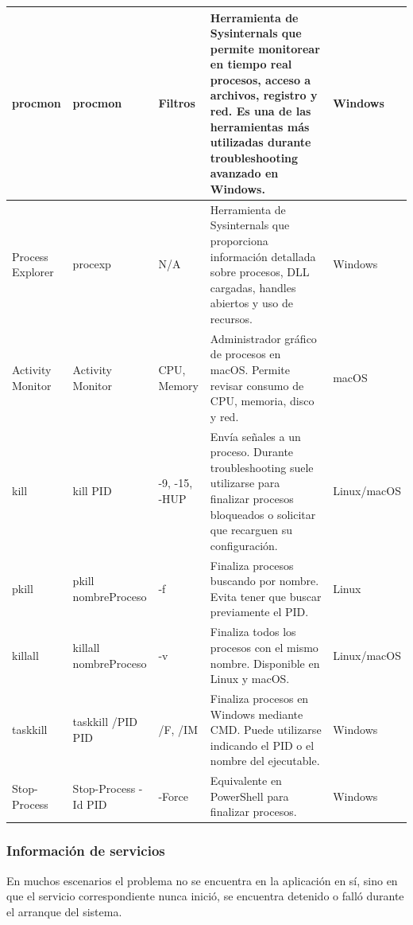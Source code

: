 \documentclass[a4paper,10pt]{article}
\begin{document}
\begin{longtable}{|p{2.8cm}|p{3cm}|p{4cm}|p{5.6cm}|p{1.5cm}|}
procmon &
procmon &
Filtros &
Herramienta de Sysinternals que permite monitorear en tiempo real procesos, acceso a archivos, registro y red. Es una de las herramientas más utilizadas durante troubleshooting avanzado en Windows. &
Windows
\\
\hline

Process Explorer &
procexp &
N/A &
Herramienta de Sysinternals que proporciona información detallada sobre procesos, DLL cargadas, handles abiertos y uso de recursos. &
Windows
\\
\hline

Activity Monitor &
Activity Monitor &
CPU, Memory &
Administrador gráfico de procesos en macOS. Permite revisar consumo de CPU, memoria, disco y red. &
macOS
\\
\hline

kill &
kill PID &
-9, -15, -HUP &
Envía señales a un proceso. Durante troubleshooting suele utilizarse para finalizar procesos bloqueados o solicitar que recarguen su configuración. &
Linux/macOS
\\
\hline

pkill &
pkill nombreProceso &
-f &
Finaliza procesos buscando por nombre. Evita tener que buscar previamente el PID. &
Linux
\\
\hline

killall &
killall nombreProceso &
-v &
Finaliza todos los procesos con el mismo nombre. Disponible en Linux y macOS. &
Linux/macOS
\\
\hline

taskkill &
taskkill /PID PID &
/F, /IM &
Finaliza procesos en Windows mediante CMD. Puede utilizarse indicando el PID o el nombre del ejecutable. &
Windows
\\
\hline

Stop-Process &
Stop-Process -Id PID &
-Force &
Equivalente en PowerShell para finalizar procesos. &
Windows
\\
\hline

\end{longtable}


\subsubsection{Información de servicios}

En muchos escenarios el problema no se encuentra en la aplicación en sí, sino en
que el servicio correspondiente nunca inició, se encuentra detenido o falló
durante el arranque del sistema.
\end{document}
